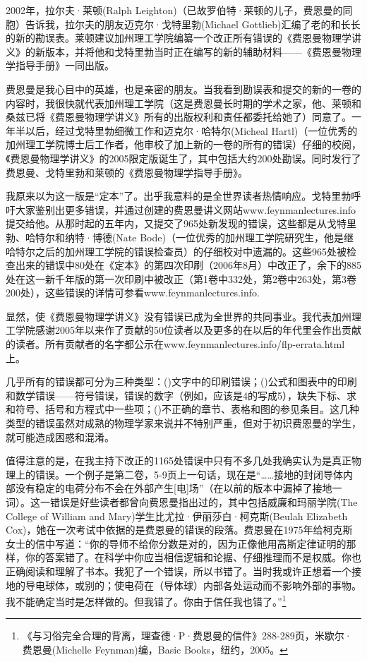 \documentclass[UTF8, 12pt, a4paper, twoside]{ctexbook}
\begin{document}
2002年，拉尔夫·莱顿(Ralph Leighton)（已故罗伯特·莱顿的儿子，费恩曼的同胞）告诉我，拉尔夫的朋友迈克尔·戈特里勃(Michael Gottlieb)汇编了老的和长长的新的勘误表。莱顿建议加州理工学院编纂一个改正所有错误的《费恩曼物理学讲义》的新版本，并将他和戈特里勃当时正在编写的新的辅助材料——《费恩曼物理学指导手册》一同出版。

费恩曼是我心目中的英雄，也是亲密的朋友。当我看到勘误表和提交的新的一卷的内容时，我很快就代表加州理工学院（这是费恩曼长时期的学术之家，他、莱顿和桑兹已将《费恩曼物理学讲义》所有的出版权利和责任都委托给她了）同意了。一年半以后，经过戈特里勃细微工作和迈克尔·哈特尔(Micheal Hartl)（一位优秀的加州理工学院博士后工作者，他审校了加上新的一卷的所有的错误）仔细的校阅，《费恩曼物理学讲义》的2005限定版诞生了，其中包括大约200处勘误。同时发行了费恩曼、戈特里勃和莱顿的《费恩曼物理学指导手册》。

我原来以为这一版是“定本”了。出乎我意料的是全世界读者热情响应。戈特里勃呼吁大家鉴别出更多错误，并通过创建的费恩曼讲义网站www.feynmanlectures.info提交给他。从那时起的五年内，又提交了965处新发现的错误，这些都是从戈特里勃、哈特尔和纳特·博德(Nate Bode)（一位优秀的加州理工学院研究生，他是继哈特尔之后的加州理工学院的错误检查员）的仔细校对中遗漏的。这些965处被检查出来的错误中80处在《定本》的第四次印刷（2006年8月）中改正了，余下的885处在这一新千年版的第一次印刷中被改正（第1卷中332处，第2卷中263处，第3卷200处），这些错误的详情可参看www.feynmanlectures.info.

显然，使《费恩曼物理学讲义》没有错误已成为全世界的共同事业。我代表加州理工学院感谢2005年以来作了贡献的50位读者以及更多的在以后的年代里会作出贡献的读者。所有贡献者的名字都公示在www.feynmanlectures.info/flp-errata.html上。

几乎所有的错误都可分为三种类型：()文字中的印刷错误；()公式和图表中的印刷和数学错误——符号错误，错误的数字（例如，应该是4的写成5），缺失下标、求和符号、括号和方程式中一些项；()不正确的章节、表格和图的参见条目。这几种类型的错误虽然对成熟的物理学家来说并不特别严重，但对于初识费恩曼的学生，就可能造成困惑和混淆。

值得注意的是，在我主持下改正的1165处错误中只有不多几处我确实认为是真正物理上的错误。一个例子是第二卷，5-9页上一句话，现在是“……接地的封闭导体内部没有稳定的电荷分布不会在外部产生[电]场”（在以前的版本中漏掉了接地一词）。这一错误是好些读者都曾向费恩曼指出过的，其中包括威廉和玛丽学院(The College of William and Mary)学生比尤拉·伊丽莎白·柯克斯(Beulah Elizabeth Cox)，她在一次考试中依据的是费恩曼的错误的段落。费恩曼在1975年给柯克斯女士的信中写道：“你的导师不给你分数是对的，因为正像他用高斯定律证明的那样，你的答案错了。在科学中你应当相信逻辑和论据、仔细推理而不是权威。你也正确阅读和理解了书本。我犯了一个错误，所以书错了。当时我或许正想着一个接地的导电球体，或别的；使电荷在（导体球）内部各处运动而不影响外部的事物。我不能确定当时是怎样做的。但我错了。你由于信任我也错了。”\footnote{《与习俗完全合理的背离，理查德·P·费恩曼的信件》288-289页，米歇尔·费恩曼(Michelle Feynman)编，Basic Books，纽约，2005。}
\end{document}

